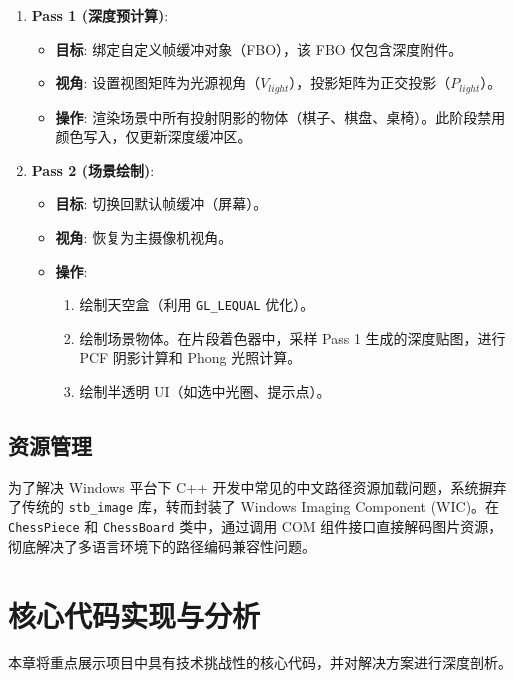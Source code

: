 \documentclass[a4paper]{article}
\begin{document}
\begin{enumerate}
    \item \textbf{Pass 1 (深度预计算)}:
    \begin{itemize}
        \item \textbf{目标}: 绑定自定义帧缓冲对象（FBO），该 FBO 仅包含深度附件。
        \item \textbf{视角}: 设置视图矩阵为光源视角（$V_{light}$），投影矩阵为正交投影（$P_{light}$）。
        \item \textbf{操作}: 渲染场景中所有投射阴影的物体（棋子、棋盘、桌椅）。此阶段禁用颜色写入，仅更新深度缓冲区。
    \end{itemize}

    \item \textbf{Pass 2 (场景绘制)}:
    \begin{itemize}
        \item \textbf{目标}: 切换回默认帧缓冲（屏幕）。
        \item \textbf{视角}: 恢复为主摄像机视角。
        \item \textbf{操作}: 
            \begin{enumerate}
                \item 绘制天空盒（利用 \texttt{GL\_LEQUAL} 优化）。
                \item 绘制场景物体。在片段着色器中，采样 Pass 1 生成的深度贴图，进行 PCF 阴影计算和 Phong 光照计算。
                \item 绘制半透明 UI（如选中光圈、提示点）。
            \end{enumerate}
    \end{itemize}
\end{enumerate}

\subsection{资源管理}
为了解决 Windows 平台下 C++ 开发中常见的中文路径资源加载问题，系统摒弃了传统的 \texttt{stb\_image} 库，转而封装了 Windows Imaging Component (WIC)。在 \texttt{ChessPiece} 和 \texttt{ChessBoard} 类中，通过调用 COM 组件接口直接解码图片资源，彻底解决了多语言环境下的路径编码兼容性问题。

\section{核心代码实现与分析}

本章将重点展示项目中具有技术挑战性的核心代码，并对解决方案进行深度剖析。
\end{document}
